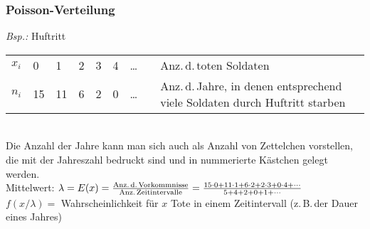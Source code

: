 \documentclass[a4paper,10pt,titlepage]{scrartcl}
\begin{document}
\subsubsection*{Poisson-Verteilung}
\label{sec:poisson-verteilung_erklaerung}
\emph{Bsp.:} Huftritt\smallskip\\
\begin{tabular}{l||l|l|l|l|l|lll}
 $x_i$ & 0  & 1  & 2 & 3 & 4 & \dots & & Anz.\,d.\,toten Soldaten\\ \cline{0-6}
 $n_i$ & 15 & 11 & 6 & 2 & 0 & \dots & & Anz.\,d.\,Jahre, in denen entsprechend viele Soldaten durch Huftritt starben\\
\end{tabular}
\medskip\\
Die Anzahl der Jahre kann man sich auch als Anzahl von Zettelchen vorstellen, die mit der Jahreszahl bedruckt sind und in nummerierte Kästchen gelegt werden.\bigskip\\
Mittelwert: $\lambda=E(x)=\frac{\text{Anz.\,d.\,Vorkommnisse}}{\text{Anz.\,Zeitintervalle}}=\frac{15\cdot 0+11\cdot 1+6\cdot 2+2\cdot 3+0\cdot 4+\cdots}{5+4+2+0+1+\cdots}$
\smallskip\\
$f(x/\lambda)=$ Wahrscheinlichkeit für $x$ Tote in einem Zeitintervall (z.\,B.\,der Dauer eines Jahres)
\end{document}
